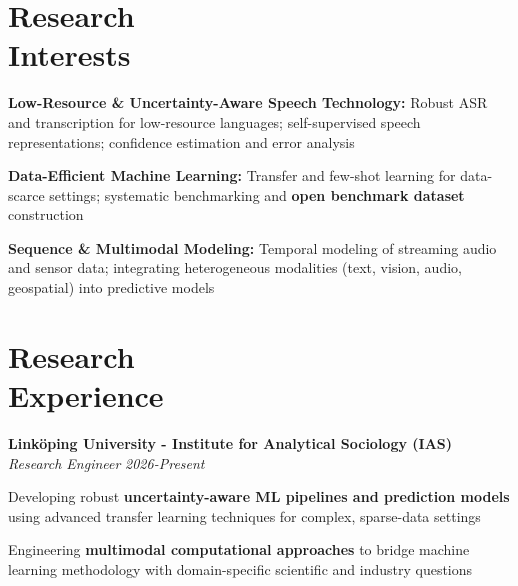 \documentclass[margin,line]{resume}
\begin{document}
\begin{resume}
    \section{\mysidestyle \normalsize{Research\\Interests}}
    \begin{list2}\setlength\itemsep{0.75mm}
        \item \textbf{Low-Resource \& Uncertainty-Aware Speech Technology:} Robust ASR and transcription for low-resource languages; self-supervised speech representations; confidence estimation and error analysis
        \item \textbf{Data-Efficient Machine Learning:} Transfer and few-shot learning for data-scarce settings; systematic benchmarking and \textbf{open benchmark dataset} construction
        \item \textbf{Sequence \& Multimodal Modeling:} Temporal modeling of streaming audio and sensor data; integrating heterogeneous modalities (text, vision, audio, geospatial) into predictive models
    \end{list2}
    
    \section{\mysidestyle \normalsize{Research\\Experience}}

        \textbf{Link\"oping University - Institute for Analytical Sociology (IAS)}\\
        \textit{Research Engineer} \hfill \textsl{2026-Present}\\
        \begin{list2}\setlength\itemsep{0.75mm}
        \item Developing robust \textbf{uncertainty-aware ML pipelines and prediction models} using advanced transfer learning techniques for complex, sparse-data settings
        \item Engineering \textbf{multimodal computational approaches} to bridge machine learning methodology with domain-specific scientific and industry questions
        \end{list2}


\end{resume}
\end{document}
